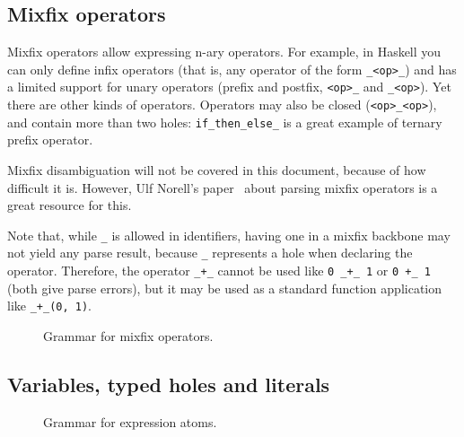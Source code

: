 \subsection{Mixfix operators}\label{subsec:zilch-grammar-expressions-mixfix}

Mixfix operators allow expressing n-ary operators.
For example, in Haskell you can only define infix operators (that is, any operator of the form \verb|_<op>_|) and has a limited support for unary operators (prefix and postfix, \verb|<op>_| and \verb|_<op>|).
Yet there are other kinds of operators.
Operators may also be closed (\verb|<op>_<op>|), and contain more than two holes: \verb|if_then_else_| is a great example of ternary prefix operator.

Mixfix disambiguation will not be covered in this document, because of how difficult it is.
However, Ulf Norell's paper~\cite{mixfix-operators} about parsing mixfix operators is a great resource for this.

Note that, while \verb|_| is allowed in identifiers, having one in a mixfix backbone may not yield any parse result, because \verb|_| represents a hole when declaring the operator.
Therefore, the operator \verb|_+_| cannot be used like \verb|0 _+_ 1| or \verb|0 +_ 1| (both give parse errors), but it may be used as a standard function application like \verb|_+_(0, 1)|.

\begin{figure}[H]
  \centering


  \caption{Grammar for mixfix operators.}
  \label{fig:zilch-grammar-expressions-mxifix-grammar}
\end{figure}

\subsection{Variables, typed holes and literals}\label{subsec:zilch-grammar-expressions-basicexpr}

\begin{figure}[H]
  \centering


  \caption{Grammar for expression atoms.}
  \label{fig:zilch-grammar-expressions-atom-grammar}
\end{figure}

